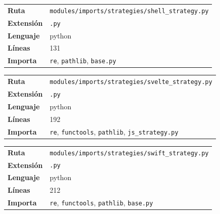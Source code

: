 \documentclass[12pt, a4paper]{report}
\begin{document}
\medskip

\begin{fichabox}
\small
\begin{tabular}{@{}ll@{}}
  \textbf{Ruta} & \texttt{modules/imports/strategies/shell\_strategy.py} \\
  \textbf{Extensión} & \texttt{.py} \\
  \textbf{Lenguaje} & python \\
  \textbf{Líneas} & 131 \\
  \textbf{Importa} & \parbox[t]{10cm}{\texttt{re}, \texttt{pathlib}, \texttt{base.py}} \\
\end{tabular}
\end{fichabox}

\medskip

\begin{fichabox}
\small
\begin{tabular}{@{}ll@{}}
  \textbf{Ruta} & \texttt{modules/imports/strategies/svelte\_strategy.py} \\
  \textbf{Extensión} & \texttt{.py} \\
  \textbf{Lenguaje} & python \\
  \textbf{Líneas} & 192 \\
  \textbf{Importa} & \parbox[t]{10cm}{\texttt{re}, \texttt{functools}, \texttt{pathlib}, \texttt{js\_strategy.py}} \\
\end{tabular}
\end{fichabox}

\medskip

\begin{fichabox}
\small
\begin{tabular}{@{}ll@{}}
  \textbf{Ruta} & \texttt{modules/imports/strategies/swift\_strategy.py} \\
  \textbf{Extensión} & \texttt{.py} \\
  \textbf{Lenguaje} & python \\
  \textbf{Líneas} & 212 \\
  \textbf{Importa} & \parbox[t]{10cm}{\texttt{re}, \texttt{functools}, \texttt{pathlib}, \texttt{base.py}} \\
\end{tabular}
\end{fichabox}

\medskip
\end{document}
